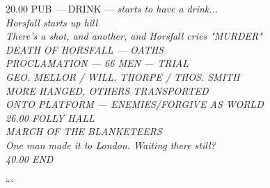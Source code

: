\begin{tabbing}

20.00 \> PUB — DRINK — \itshape starts to have a drink...
\\
\> \itshape Horsfall starts up hill
\\
\> \itshape There's a shot, and another, and Horsfall cries "MURDER"
\\
\> DEATH OF HORSFALL — OATHS
\\
\> PROCLAMATION — 66 MEN — TRIAL
\\
\> GEO. MELLOR / WILL. THORPE / THOS. SMITH
\\
 MORE HANGED, OTHERS TRANSPORTED
\\
\> ONTO PLATFORM — ENEMIES/FORGIVE AS WORLD
\\
26.00 \> FOLLY HALL
\\
\> [EXTRA] MARCH OF THE BLANKETEERS
\\
\> \itshape One man made it to London. Waiting there still? 
\\
40.00 \> END
\end{tabbing}
```